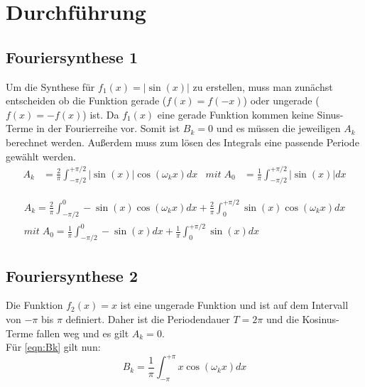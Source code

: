 \newpage
\section{Durchführung}
\subsection{Fouriersynthese 1}
    Um die Synthese für $f_1(x) = |\sin(x)|$ zu erstellen, muss man zunächst entscheiden ob die Funktion gerade ($f(x)=f(-x)$) oder ungerade ($f(x)=-f(x)$) ist.
    Da $f_1(x)$ eine gerade Funktion kommen keine Sinus-Terme in der Fourierreihe vor.
    Somit ist $B_k = 0$ und es müssen die jeweiligen $A_k$ berechnet werden.
    Außerdem muss zum lösen des Integrals eine passende Periode gewählt werden.
    \begin{align}
        A_k &= \frac{2}{\pi}\int_{-\pi/2}^{+\pi/2} |\sin(x)|\cos(\omega_k x)dx & mit\; A_0 &= \frac{1}{\pi}\int_{-\pi/2}^{+\pi/2} |\sin(x)|dx  \label{eqn:Aksin} 
    \end{align}

    
    \begin{gather}
        A_k = \frac{2}{\pi}\int_{-\pi/2}^{0} -\sin(x)\cos(\omega_k x)dx + \frac{2}{\pi}\int_{0}^{+\pi/2} \sin(x)\cos(\omega_k x)dx \\
        mit \; A_0 = \frac{1}{\pi}\int_{-\pi/2}^{0} -\sin(x)dx +\frac{1}{\pi}\int_{0}^{+\pi/2} \sin(x)dx
    \end{gather}

\subsection{Fouriersynthese 2}
    Die Funktion $f_2(x) = x$ ist eine ungerade Funktion und ist auf dem Intervall von $-\pi$ bis $\pi$ definiert.
    Daher ist die Periodendauer $T = 2\pi$ und die Kosinus-Terme fallen weg und es gilt $A_k = 0$.\\
    Für \eqref{eqn:Bk} gilt nun:
    \begin{equation}
        B_k = \frac{1}{\pi}\int_{-\pi}^{+\pi} x\cos(\omega_k x)dx
    \end{equation}
\label{sec:Durchführung}
